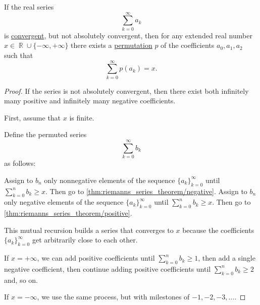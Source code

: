 \begin{theorem}\label{thm:riemanns_series_permutation_theorem}
  If the real series
  \begin{equation*}
    \sum_{k=0}^\infty a_k
  \end{equation*}
  is \hyperref[def:convergent_series]{convergent}, but not absolutely convergent, then for any extended real number \( x \in \BbbR \cup \{ -\infty, +\infty \} \) there exists a \hyperref[def:symmetric_group]{permutation} \( p \) of the coefficients \( a_0, a_1, a_2 \)
  such that
  \begin{equation*}
    \sum_{k=0}^\infty p(a_k) = x.
  \end{equation*}
\end{theorem}
\begin{proof}
  If the series is not absolutely convergent, then there exist both infinitely many positive and infinitely many negative coefficients.

  First, assume that \( x \) is finite.

  Define the permuted series
  \begin{equation*}
    \sum_{k=0}^\infty b_k
  \end{equation*}
  as follows:
  \begin{thmenum}
     Assign to \( b_n \) only nonnegative elements of the sequence \( \{ a_k \}_{k=0}^\infty \) until \( \sum_{k=0}^n b_k \geq x \). Then go to \ref{thm:riemanns_series_theorem/negative}.
     Assign to \( b_n \) only negative elements of the sequence \( \{ a_k \}_{k=0}^\infty \) until \( \sum_{k=0}^n b_k \geq x \). Then go to \ref{thm:riemanns_series_theorem/positive}.
  \end{thmenum}

  This mutual recursion builds a series that converges to \( x \) because the coefficients \( \{ a_k \}_{k=0}^\infty \) get arbitrarily close to each other.

  If \( x = +\infty \), we can add positive coefficients until \( \sum_{k=0}^n b_k \geq 1 \), then add a single negative coefficient, then continue adding positive coefficients until \( \sum_{k=0}^n b_k \geq 2 \) and, so on.

  If \( x = -\infty \), we use the same process, but with milestones of \( -1, -2, -3, \ldots \).
\end{proof}

